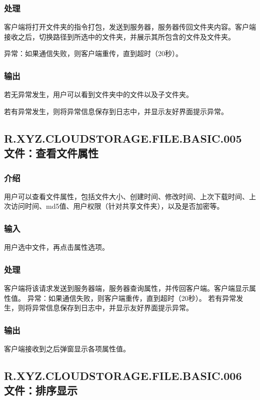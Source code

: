 \subsubsection{处理}
客户端将打开文件夹的指令打包，发送到服务器，服务器传回文件夹内容。客户端接收之后，切换路径到所选中的文件夹，并展示其所包含的文件及文件夹。

异常：如果通信失败，则客户端重传，直到超时（20秒）。

\subsubsection{输出}
若无异常发生，用户可以看到文件夹中的文件以及子文件夹。

若有异常发生，则将异常信息保存到日志中，并显示友好界面提示异常。



\subsection{R.XYZ.CLOUDSTORAGE.FILE.BASIC.005 文件：查看文件属性}

\subsubsection{介绍} 
用户可以查看文件属性，包括文件大小、创建时间、修改时间、上次下载时间、上次访问时间、md5值、用户权限（针对共享文件夹），以及是否加密等。

\subsubsection{输入} 
用户选中文件，再点击属性选项。

\subsubsection{处理}
客户端将该请求发送到服务器端，服务器查询属性，并传回客户端。客户端显示属性值。
异常：如果通信失败，则客户端重传，直到超时（20秒）。
若有异常发生，则将异常信息保存到日志中，并显示友好界面提示异常。

\subsubsection{输出}
客户端接收到之后弹窗显示各项属性值。


\subsection{R.XYZ.CLOUDSTORAGE.FILE.BASIC.006 文件：排序显示}

